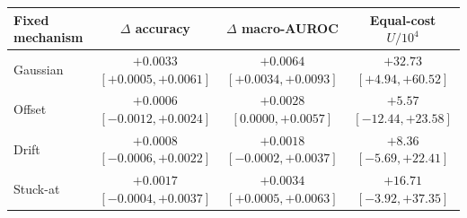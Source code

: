 \begin{tabular}{lccc}
\toprule
Fixed mechanism & $\Delta$ accuracy & $\Delta$ macro-AUROC & Equal-cost $U/10^4$ \\
\midrule
Gaussian & $+0.0033$ $[+0.0005,+0.0061]$ & $+0.0064$ $[+0.0034,+0.0093]$ & $+32.73$ $[+4.94,+60.52]$ \\
Offset & $+0.0006$ $[-0.0012,+0.0024]$ & $+0.0028$ $[0.0000,+0.0057]$ & $+5.57$ $[-12.44,+23.58]$ \\
Drift & $+0.0008$ $[-0.0006,+0.0022]$ & $+0.0018$ $[-0.0002,+0.0037]$ & $+8.36$ $[-5.69,+22.41]$ \\
Stuck-at & $+0.0017$ $[-0.0004,+0.0037]$ & $+0.0034$ $[+0.0005,+0.0063]$ & $+16.71$ $[-3.92,+37.35]$ \\
\bottomrule
\end{tabular}
